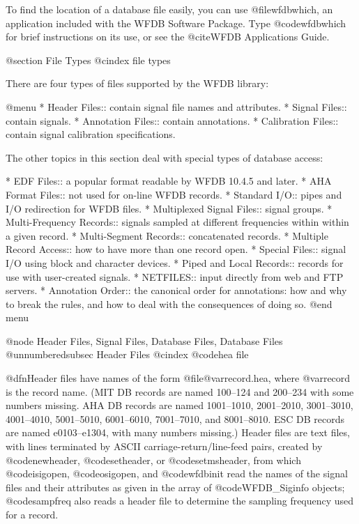 {{{{{{{{{{{{{{To find the location of a database file easily, you can use @file{wfdbwhich},
an application included with the WFDB Software Package.  Type
@code{wfdbwhich} for brief instructions on its use, or see the @cite{WFDB
Applications Guide}.

@section File Types
@cindex file types

There are four types of files supported by the WFDB library:

@menu
* Header Files::		contain signal file names and attributes.
* Signal Files::		contain signals.
* Annotation Files::		contain annotations.
* Calibration Files::		contain signal calibration specifications.

The other topics in this section deal with special types of database access:

* EDF Files::                   a popular format readable by WFDB 10.4.5 and
                                 later.
* AHA Format Files::		not used for on-line WFDB records.
* Standard I/O::		pipes and I/O redirection for WFDB files.
* Multiplexed Signal Files::	signal groups.
* Multi-Frequency Records::     signals sampled at different frequencies within
                                 within a given record.
* Multi-Segment Records::       concatenated records.
* Multiple Record Access::	how to have more than one record open.
* Special Files::		signal I/O using block and character devices.
* Piped and Local Records::	records for use with user-created signals.
* NETFILES::			input directly from web and FTP servers.
* Annotation Order::            the canonical order for annotations:
                                 how and why to break the rules, and how
                                 to deal with the consequences of doing so.
@end menu

@node     Header Files, Signal Files, Database Files, Database Files
@unnumberedsubsec Header Files
@cindex @code{hea} file

@dfn{Header files} have names of the form @file{@var{record}.hea}, where
@var{record} is the record name.  (MIT DB records are named 100--124 and
200--234 with some numbers missing.  AHA DB records are named
1001--1010, 2001--2010, 3001--3010, 4001--4010, 5001--5010, 6001--6010,
7001--7010, and 8001--8010.  ESC DB records are named e0103--e1304, with
many numbers missing.)  Header files are text files, with lines
terminated by ASCII carriage-return/line-feed pairs, created by
@code{newheader}, @code{setheader}, or @code{setmsheader}, from which
@code{isigopen}, @code{osigopen}, and @code{wfdbinit} read the names of
the signal files and their attributes as given in the array of
@code{WFDB_Siginfo} objects; @code{sampfreq} also reads a header
file to determine the sampling frequency used for a record.

}}}}}}}}}}}}}}

